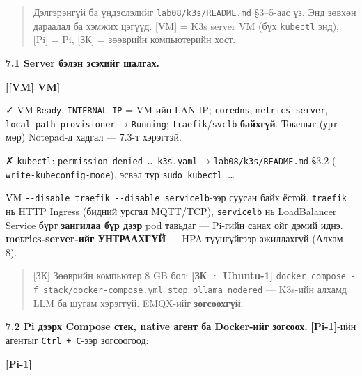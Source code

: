\begin{quote}
Дэлгэрэнгүй ба үндэслэлийг \texttt{lab08/\allowbreak{}k3s/\allowbreak{}README.\allowbreak{}md} §3--5-аас үз. Энд зөвхөн дараалал ба хэмжих цэгүүд. {[}VM{]} = K3s server VM (бүх \texttt{kubectl} энд), {[}Pi{]} = Pi, {[}ЗК{]} = зөөврийн компьютерийн хост.
\end{quote}

\textbf{7.1 Server бэлэн эсэхийг шалгах.}

\textbf{{[}{[}VM{]} VM{]}}

\begin{Shaded}
\begin{Highlighting}[]
\end{Highlighting}
\end{Shaded}

✓ VM \texttt{Ready}, \texttt{INTERNAL-IP} = VM-ийн LAN IP; \texttt{coredns}, \texttt{metrics-server}, \texttt{local-path-provisioner} → \texttt{Running}; \texttt{traefik}/\allowbreak\texttt{svclb} \textbf{байхгүй}. Токеныг (урт мөр) Notepad-д хадгал --- 7.3-т хэрэгтэй.

✗ \texttt{kubectl}: \texttt{permission\ denied\ \ldots{}\ k3s.\allowbreak{}yaml} → \texttt{lab08/\allowbreak{}k3s/\allowbreak{}README.\allowbreak{}md} §3.2 (\texttt{-\/\allowbreak{}-write-kubeconfig-mode}), эсвэл түр \texttt{sudo\ kubectl\ \ldots{}}.

VM \texttt{-\/\allowbreak{}-disable\ traefik\ -\/\allowbreak{}-disable\ servicelb}-ээр суусан байх ёстой. \texttt{traefik} нь HTTP Ingress (бидний урсгал MQTT/TCP), \texttt{servicelb} нь LoadBalancer Service бүрт \textbf{зангилаа бүр дээр} pod тавьдаг --- Pi-гийн санах ойг дэмий иднэ. \textbf{metrics-server-ийг УНТРААХГҮЙ} --- HPA түүнгүйгээр ажиллахгүй (Алхам 8).

\begin{quote}
{[}ЗК{]} Зөөврийн компьютер 8 GB бол: \textbf{{[}ЗК · Ubuntu-1{]}} \texttt{docker\ compose\ -f\ stack/\allowbreak{}docker-compose.\allowbreak{}yml\ stop\ ollama\ nodered} --- K3s-ийн алхамд LLM ба шугам хэрэггүй. EMQX-ийг \textbf{зогсоохгүй}.
\end{quote}

\textbf{7.2 Pi дээрх Compose стек, native агент ба Docker-ийг зогсоох.} \textbf{{[}Pi-1{]}}-ийн агентыг \texttt{Ctrl\ +\ C}-ээр зогсоогоод:

\textbf{{[}Pi-1{]}}

